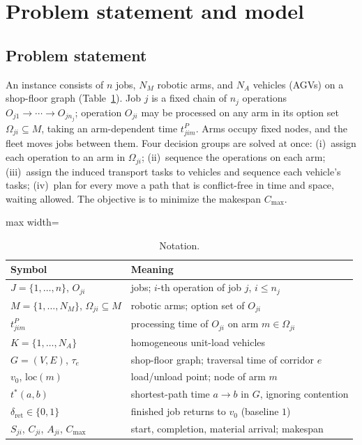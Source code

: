 \documentclass[preprint,review,12pt,authoryear,doubleblind]{elsarticle}
\begin{document}
\section{Problem statement and model}
\label{sec:Chapter_III}
\subsection{Problem statement}

An instance consists of $n$ jobs, $N_M$ robotic arms, and $N_A$ vehicles (AGVs) on a shop-floor graph (Table~\ref{tab:notation}).
Job $j$ is a fixed chain of $n_j$ operations $O_{j1}\to\cdots\to O_{jn_j}$; operation $O_{ji}$ may be processed on any arm in its option set $\Omega_{ji}\subseteq M$, taking an arm-dependent time $t^P_{jim}$.
Arms occupy fixed nodes, and the fleet moves jobs between them.
Four decision groups are solved at once:
(i)~assign each operation to an arm in $\Omega_{ji}$;
(ii)~sequence the operations on each arm;
(iii)~assign the induced transport tasks to vehicles and sequence each vehicle's tasks;
(iv)~plan for every move a path that is conflict-free in time and space, waiting allowed.
The objective is to minimize the makespan $C_{\max}$.

\begin{table}[!htbp]
\caption{Notation.}
\label{tab:notation}
\footnotesize
\begin{adjustbox}{max width=\linewidth}\begin{tabular}{@{}ll@{}}
\toprule
Symbol & Meaning \\
\midrule
$J=\{1,\dots,n\}$, $O_{ji}$ & jobs; $i$-th operation of job $j$, $i\le n_j$ \\
$M=\{1,\dots,N_M\}$, $\Omega_{ji}\subseteq M$ & robotic arms; option set of $O_{ji}$ \\
$t^P_{jim}$ & processing time of $O_{ji}$ on arm $m\in\Omega_{ji}$ \\
$K=\{1,\dots,N_A\}$ & homogeneous unit-load vehicles \\
$G=(V,E)$, $\tau_e$ & shop-floor graph; traversal time of corridor $e$ \\
$v_0$, $\mathrm{loc}(m)$ & load/unload point; node of arm $m$ \\
$t^{*}(a,b)$ & shortest-path time $a\to b$ in $G$, ignoring contention \\
$\delta_{\mathrm{ret}}\in\{0,1\}$ & finished job returns to $v_0$ (baseline $1$) \\
$S_{ji}$, $C_{ji}$, $A_{ji}$, $C_{\max}$ & start, completion, material arrival; makespan \\
\bottomrule
\end{tabular}\end{adjustbox}
\end{table}
\end{document}
